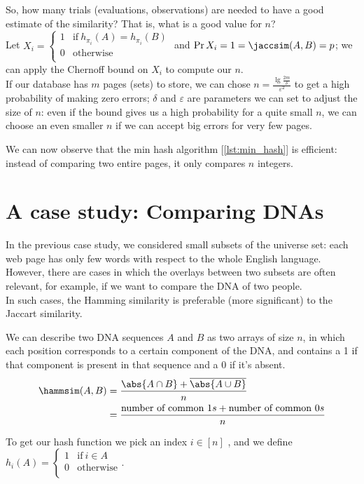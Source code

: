So, how many trials (evaluations, observations) are needed to have a good estimate of the similarity? That is, what is a good value for $n$?\\
Let $
	X_i=\begin{cases}
	1 & \text{if}\ h_{\pi_i}(A)=h_{\pi_i}(B)\\
	0 & \text{otherwise}\\
	\end{cases} $
and $\Pr{X_i=1} = \jaccsim(A,B)=p$; we can apply the Chernoff bound on $X_i$ to compute our $n$.\\
If our database has $m$ pages (sets) to store, we can chose $n = \frac{\lg{\frac{2m}{\delta}}}{\varepsilon^2}$ to get a high probability of making zero errors; $\delta$ and $\varepsilon$ are parameters we can set to adjust the size of $n$: even if the bound gives us a high probability for a quite small $n$, we can choose an even smaller $n$ if we can accept big errors for very few pages.

We can now observe that the min hash algorithm [\ref{lst:min_hash}] is efficient: instead of comparing two entire pages, it only compares $n$ integers.

\section{A case study: Comparing DNAs}

In the previous case study, we considered small subsets of the universe set: each web page has only few words with respect to the whole English language.\\
However, there are cases in which the overlays between two subsets are often relevant, for example, if we want to compare the DNA of two people.\\
In such cases, the Hamming similarity is preferable (more significant) to the Jaccart similarity.

We can describe two DNA sequences $A$ and $B$ as two arrays of size $n$, in which each position corresponds to a certain component of the DNA, and contains a 1 if that component is present in that sequence and a 0 if it's absent.
\begin{align*}
	\hammsim(A,B) &=
	\frac{\abs{A \cap B} + \overline{\abs{A \cup B}}}{n}\\
	&= \frac{\text{number of common } 1s + \text{number of common } 0s}{n}
\end{align*}

To get our hash function we pick an index $i\in[n]$ \uar, and we define\\
$ h_i(A)=\begin{cases}
	1 & \text{if}\ i \in A\\
	0 & \text{otherwise}\\
\end{cases} $. \label{hamming_hash}

